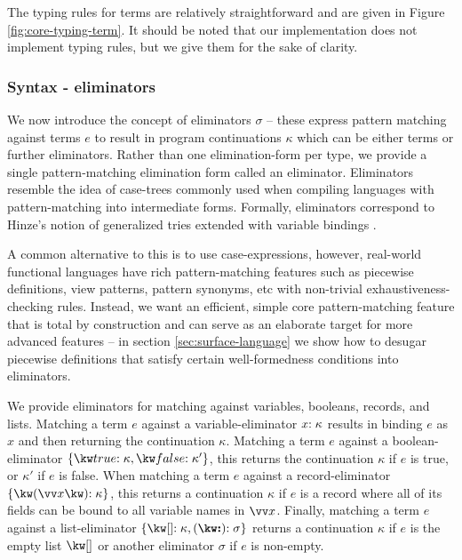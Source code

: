 \noindent
The typing rules for terms are relatively straightforward and are given in Figure \ref{fig:core-typing-term}. It should be noted that our implementation does not implement typing rules, but we give them for the sake of clarity.
  


\subsubsection{Syntax - eliminators}
\label{sssec:syntax-eliminator}
We now introduce the concept of eliminators $\sigma$ -- these express pattern matching against terms $e$ to result in program continuations $\kappa$ which can be either terms or further eliminators. Rather than one elimination-form per type, we provide a single pattern-matching elimination form called an eliminator. Eliminators resemble the idea of case-trees commonly used when compiling languages with pattern-matching into intermediate forms. Formally, eliminators correspond to Hinze's notion of generalized tries extended with variable bindings \cite{hinze00}. 

A common alternative to this is to use case-expressions, however, real-world functional languages have rich pattern-matching features such as piecewise definitions, view patterns, pattern synonyms, etc with non-trivial exhaustiveness-checking rules. Instead, we want an efficient, simple core pattern-matching feature that is total by construction and can serve as an elaborate target for more advanced features -- in section \ref{sec:surface-language} we show how to desugar piecewise definitions that satisfy certain well-formedness conditions into eliminators. 

We provide eliminators for matching against variables, booleans, records, and lists. Matching a term $e$ against a variable-eliminator ${x}{:}\;{\kappa}$ results in binding $e$ as $x$ and then returning the continuation $\kappa$. Matching a term $e$ against a boolean-eliminator $\elimBool{\kappa}{\kappa'}$, this returns the continuation $\kappa$ if $e$ is true, or $\kappa'$ if $e$ is false. When matching a term $e$ against a record-eliminator $\elimRec{\seq{x}}{\kappa}$, this returns a continuation $\kappa$ if $e$ is a record where all of its fields can be bound to all variable names in $\seq{x}$. Finally, matching a term $e$ against a list-eliminator $\elimList{\kappa}{\sigma}$ returns a continuation $\kappa$ if $e$ is the empty list $\exNil$ or another eliminator $\sigma$ if $e$ is non-empty.

